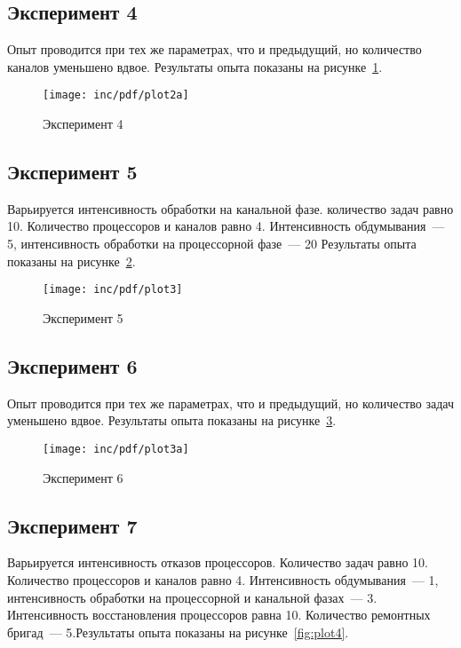 \subsection*{Эксперимент 4}

Опыт проводится при тех же параметрах, что и предыдущий, но количество каналов уменьшено вдвое. Результаты опыта показаны на рисунке~\ref{fig:plot2a}.

\begin{figure}[ht!]
  \centering
  \texttt{[image: inc/pdf/plot2a]}
  \caption{Эксперимент 4}
  \label{fig:plot2a}
\end{figure}

\subsection*{Эксперимент 5}

Варьируется интенсивность обработки на канальной фазе. количество задач равно 10. Количество процессоров и каналов равно 4. Интенсивность обдумывания~--- 5, интенсивность обработки на процессорной фазе~--- 20 Результаты опыта показаны на рисунке~\ref{fig:plot3}.

\begin{figure}[ht!]
  \centering
  \texttt{[image: inc/pdf/plot3]}
  \caption{Эксперимент 5}
  \label{fig:plot3}
\end{figure}

\subsection*{Эксперимент 6}

Опыт проводится при тех же параметрах, что и предыдущий, но количество задач уменьшено вдвое. Результаты опыта показаны на рисунке~\ref{fig:plot3a}.

\begin{figure}[ht!]
  \centering
  \texttt{[image: inc/pdf/plot3a]}
  \caption{Эксперимент 6}
  \label{fig:plot3a}
\end{figure}

\subsection*{Эксперимент 7}

Варьируется интенсивность отказов процессоров. Количество задач равно 10. Количество процессоров и каналов равно 4. Интенсивность обдумывания~--- 1, интенсивность обработки на процессорной  и канальной фазах~--- 3. Интенсивность восстановления процессоров равна 10. Количество ремонтных бригад~--- 5.Результаты опыта показаны на рисунке~\ref{fig:plot4}.


